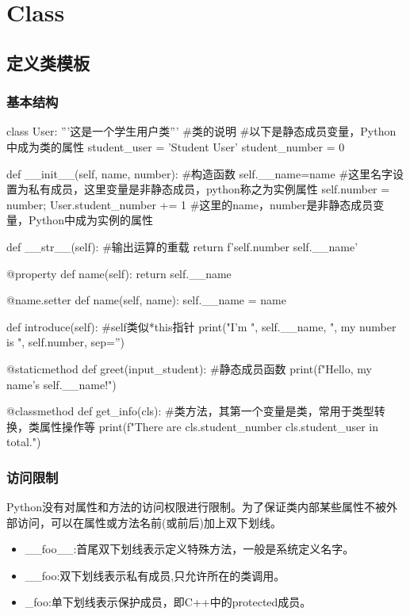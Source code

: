 \section{Class}

  \subsection{定义类模板}
    \subsubsection{基本结构}
      \begin{codeblock}[language=python, caption={define a class}]
        class User: 
            '''这是一个学生用户类''' #类的说明
            #以下是静态成员变量，Python中成为类的属性
            student_user = 'Student User' 
            student_number = 0
        
            def __init__(self, name, number): #构造函数
                self.__name=name #这里名字设置为私有成员，这里变量是非静态成员，python称之为实例属性
                self.number = number; 
                User.student_number += 1
                #这里的name，number是非静态成员变量，Python中成为实例的属性
        
            def __str__(self): #输出运算的重载
                return f'{self.number} {self.__name}'
        
            @property
            def name(self):
                return self.__name
        
            @name.setter
            def name(self, name):
                self.__name = name

            def introduce(self): #self类似*this指针
                print("I'm ", self.__name, ", my number is ", self.number, sep='')

            @staticmethod
            def greet(input_student): #静态成员函数
                print(f"Hello, my name's {self.__name}!")

            @classmethod 
            def get_info(cls): #类方法，其第一个变量是类，常用于类型转换，类属性操作等
                print(f"There are {cls.student_number} {cls.student_user} in total.")
      \end{codeblock}

    \subsubsection{访问限制}
      Python没有对属性和方法的访问权限进行限制。为了保证类内部某些属性不被外部访问，可以在属性或方法名前(或前后)加上双下划线。
      \begin{itemize}
        \item \_\_foo\_\_:首尾双下划线表示定义特殊方法，一般是系统定义名字。
        \item \_\_foo:双下划线表示私有成员,只允许所在的类调用。
        \item \_foo:单下划线表示保护成员，即C++中的protected成员。
      \end{itemize}


